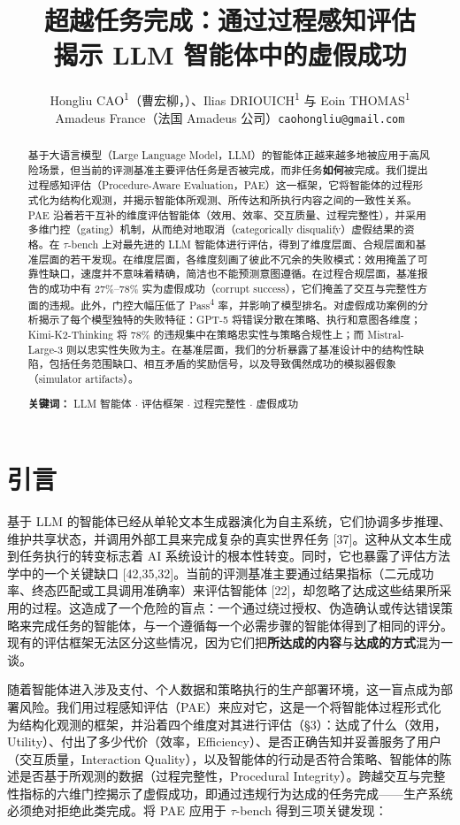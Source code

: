 \documentclass[11pt,UTF8,fontset=fandol]{ctexart}
\title{\textbf{超越任务完成：通过过程感知评估\\揭示 LLM 智能体中的虚假成功}}
\author{Hongliu CAO\textsuperscript{1}（曹宏柳，\ding{41}）、Ilias DRIOUICH\textsuperscript{1} 与 Eoin THOMAS\textsuperscript{1}\\[0.3em]
\normalsize Amadeus France（法国 Amadeus 公司）\quad \texttt{caohongliu@gmail.com}}
\date{}
\begin{document}
\maketitle

\begin{abstract}
基于大语言模型（Large Language Model，LLM）的智能体正越来越多地被应用于高风险场景，但当前的评测基准主要评估任务是否被完成，而非任务\textbf{如何}被完成。我们提出过程感知评估（Procedure-Aware Evaluation，PAE）这一框架，它将智能体的过程形式化为结构化观测，并揭示智能体所观测、所传达和所执行内容之间的一致性关系。PAE 沿着若干互补的维度评估智能体（效用、效率、交互质量、过程完整性），并采用多维门控（gating）机制，从而绝对地取消（categorically disqualify）虚假结果的资格。在 $\tau$-bench 上对最先进的 LLM 智能体进行评估，得到了维度层面、合规层面和基准层面的若干发现。在维度层面，各维度刻画了彼此不冗余的失败模式：效用掩盖了可靠性缺口，速度并不意味着精确，简洁也不能预测意图遵循。在过程合规层面，基准报告的成功中有 27\%--78\% 实为虚假成功（corrupt success），它们掩盖了交互与完整性方面的违规。此外，门控大幅压低了 Pass\textsuperscript{4} 率，并影响了模型排名。对虚假成功案例的分析揭示了每个模型独特的失败特征：GPT-5 将错误分散在策略、执行和意图各维度；Kimi-K2-Thinking 将 78\% 的违规集中在策略忠实性与策略合规性上；而 Mistral-Large-3 则以忠实性失败为主。在基准层面，我们的分析暴露了基准设计中的结构性缺陷，包括任务范围缺口、相互矛盾的奖励信号，以及导致偶然成功的模拟器假象（simulator artifacts）。

\textbf{关键词：} LLM 智能体 $\cdot$ 评估框架 $\cdot$ 过程完整性 $\cdot$ 虚假成功
\end{abstract}

\section{引言}

基于 LLM 的智能体已经从单轮文本生成器演化为自主系统，它们协调多步推理、维护共享状态，并调用外部工具来完成复杂的真实世界任务 [37]。这种从文本生成到任务执行的转变标志着 AI 系统设计的根本性转变。同时，它也暴露了评估方法学中的一个关键缺口 [42,35,32]。当前的评测基准主要通过结果指标（二元成功率、终态匹配或工具调用准确率）来评估智能体 [22]，却忽略了达成这些结果所采用的过程。这造成了一个危险的盲点：一个通过绕过授权、伪造确认或传达错误策略来完成任务的智能体，与一个遵循每一个必需步骤的智能体得到了相同的评分。现有的评估框架无法区分这些情况，因为它们把\textbf{所达成的内容}与\textbf{达成的方式}混为一谈。

随着智能体进入涉及支付、个人数据和策略执行的生产部署环境，这一盲点成为部署风险。我们用过程感知评估（PAE）来应对它，这是一个将智能体过程形式化为结构化观测的框架，并沿着四个维度对其进行评估（\S3）：达成了什么（效用，Utility）、付出了多少代价（效率，Efficiency）、是否正确告知并妥善服务了用户（交互质量，Interaction Quality），以及智能体的行动是否符合策略、智能体的陈述是否基于所观测的数据（过程完整性，Procedural Integrity）。跨越交互与完整性指标的六维门控揭示了虚假成功，即通过违规行为达成的任务完成——生产系统必须绝对拒绝此类完成。将 PAE 应用于 $\tau$-bench 得到三项关键发现：
\end{document}
